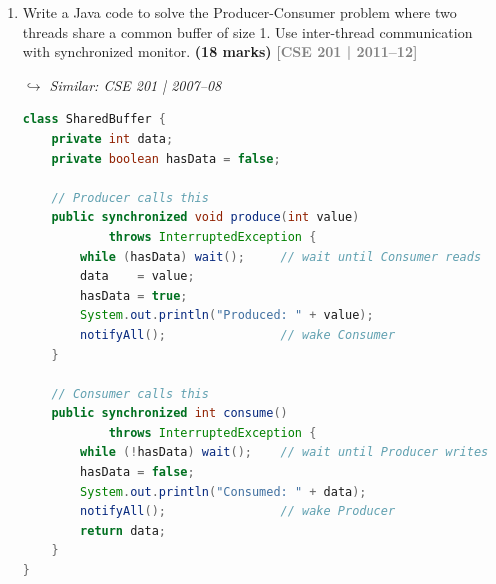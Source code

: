 \documentclass[12pt,a3paper]{article}
\newcommand{\yr}[1]{\hfill\textcolor{gray}{\small\textbf{[#1]}}}
\newcommand{\mk}[1]{\textcolor{orange!70!black}{\small\textbf{(#1 marks)}}}
\newcommand{\variant}[1]{\par\vspace{1pt}\textcolor{blue!50!black}%
  {\footnotesize\textit{$\hookrightarrow$ Similar: #1}}}
\begin{document}
\begin{enumerate}
\begin{tcolorbox}
\begin{lstlisting}[language=Java]
                try { Thread.sleep(500); }
                catch (InterruptedException e) {}
            }
        });
        worker.setDaemon(true);
        worker.start();
    }
}
\end{lstlisting}

\textbf{Key rules to prevent UI deadlocks:}
\begin{itemize}[itemsep=2pt]
  \item Never call \texttt{invokeAndWait()} while holding a lock that
    the EDT might need.
  \item Prefer \texttt{invokeLater()} (fire-and-forget) over
    \texttt{invokeAndWait()} (blocking).
  \item Keep lock scopes as small as possible --- read shared data,
    release the lock, then schedule the UI update.
\end{itemize}

\end{tcolorbox}

\item Write a Java code to solve the Producer-Consumer problem where two threads share a common buffer of size 1. Use inter-thread communication with synchronized monitor. \mk{18}
\yr{CSE 201 | 2011--12}
\variant{CSE 201 | 2007--08}

\begin{tcolorbox}[enhanced,breakable,ansbox,
  colback=cF!4,colframe=cF,boxrule=0.8pt,arc=5pt,
  title={\textbf{Answer --- Producer-Consumer: Buffer Size 1, Synchronized Monitor}},
  fonttitle=\bfseries\color{white},colbacktitle=cF]

\begin{lstlisting}[language=Java]
class SharedBuffer {
    private int data;
    private boolean hasData = false;

    // Producer calls this
    public synchronized void produce(int value)
            throws InterruptedException {
        while (hasData) wait();     // wait until Consumer reads
        data    = value;
        hasData = true;
        System.out.println("Produced: " + value);
        notifyAll();                // wake Consumer
    }

    // Consumer calls this
    public synchronized int consume()
            throws InterruptedException {
        while (!hasData) wait();    // wait until Producer writes
        hasData = false;
        System.out.println("Consumed: " + data);
        notifyAll();                // wake Producer
        return data;
    }
}


\end{lstlisting}
\end{tcolorbox}
\end{enumerate}
\end{document}
